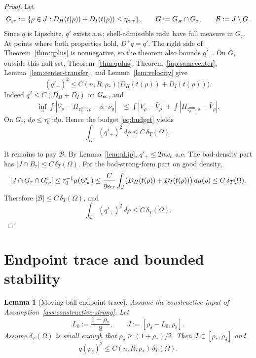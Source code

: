 \documentclass[11pt]{amsart}
\newtheorem{lemma}[theorem]{Lemma}
\theoremstyle{definition}
\newcommand{\Om}{\Omega}
\newcommand{\dT}{\delta_T}
\newcommand{\rstar}{\rho_*}
\newcommand{\rdel}{\rho_\delta}
\begin{document}
\begin{proof}
Let
\[
   G_{\rm sc}:=\{\rho\in J:
      D_H(t(\rho))+D_I(t(\rho))\le\eta_{\rm Ser}\},
   \qquad
   G:=G_{\rm sc}\cap G_\tau,
   \qquad \mathcal B:=J\setminus G .
\]
Since \(q\) is Lipschitz, \(q'\) exists a.e.; shell-admissible radii have
full measure in \(G_\tau\).  At points where both properties hold,
\(D^+q=q'\).  The right side of Theorem~\ref{thm:qplus} is nonnegative,
so the theorem also bounds \(q'_+\).  On \(G\), outside this null set,
Theorem~\ref{thm:qplus}, Theorem~\ref{inp:samecenter},
Lemma~\ref{lem:center-transfer}, and Lemma~\ref{lem:velocity} give
\[
   (q'_+)^2
   \le C(n,R,\rstar)\bigl(D_H(t(\rho))+D_I(t(\rho))\bigr).
\]
Indeed \(q^2\le C(D_H+D_I)\) on \(G_{\rm sc}\), and
\[
\begin{aligned}
   \inf_a\int |V_\rho-H_{z_\rho^{\min},\rho}-a\cdot\nu_\rho|
   &\le
   \int |V_\rho-\bar V_\rho|
   +\int |H_{z_\rho^{\min},\rho}-\bar V_\rho|.
\end{aligned}
\]
On \(G_\tau\), \(d\rho\le\tau_0^{-1}d\mu\).  Hence the budget
\eqref{eq:budget} yields
\[
   \int_G(q'_+)^2\,d\rho\le C\,\dT(\Om).
\]

It remains to pay \(\mathcal B\).  By Lemma~\ref{lem:qLip},
\(q'_+\le2n\omega_n\) a.e.  The bad-density part has
\(|J\cap B_\tau|\le C\,\dT(\Om)\).  For the bad-strong-form part on good
density,
\[
   |J\cap G_\tau\cap G_{\rm sc}^c|
   \le \tau_0^{-1}\mu(G_{\rm sc}^c)
   \le \frac{C}{\eta_{\rm Ser}}
      \int_J\bigl(D_H(t(\rho))+D_I(t(\rho))\bigr)\,d\mu(\rho)
   \le C\,\dT(\Om).
\]
Therefore \(|\mathcal B|\le C\,\dT(\Om)\), and
\[
   \int_{\mathcal B}(q'_+)^2\,d\rho\le C\,\dT(\Om).
\]
\end{proof}

\section{Endpoint trace and bounded stability}\label{sec:endpoint}

\begin{lemma}[Moving-ball endpoint trace]
\label{lem:endpoint}
Assume the constructive input of Assumption~\ref{ass:constructive-strong}.  Let
\[
   L_0:=\frac{1-\rstar}{8},\qquad
   J:=[\rdel-L_0,\rdel].
\]
Assume \(\dT(\Om)\) is small enough that
\(\rdel\ge(1+\rstar)/2\).  Then \(J\subset[\rstar,\rdel]\) and
\[
   q(\rdel)^2\le C(n,R,\rstar)\,\dT(\Om).
\]
\end{lemma}
\end{document}
